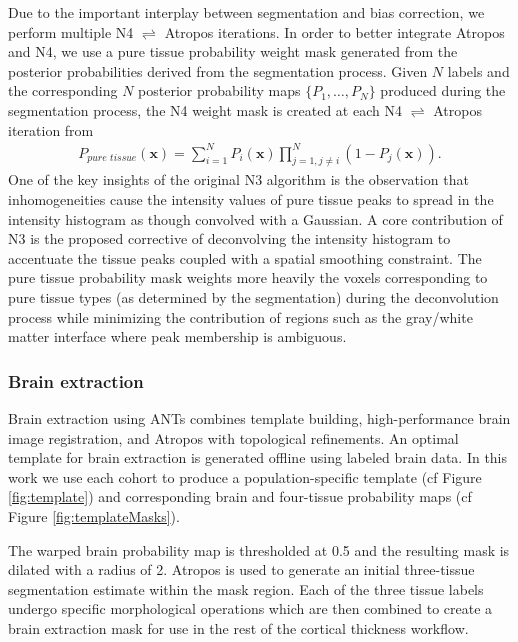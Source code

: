 Due to the important interplay between segmentation and bias correction,
we perform multiple N4 $\rightleftharpoons$ Atropos iterations.
In order to better integrate Atropos and N4, we use  
a pure tissue probability weight mask generated from the 
posterior probabilities derived from the segmentation 
process.  Given $N$ labels and the corresponding $N$
posterior probability maps $\{ P_1, \ldots, P_N\}$ produced
during the segmentation process, the N4 weight mask is 
created at each N4 $\rightleftharpoons$ Atropos iteration from
\begin{align}
  P_{pure\,\,tissue}(\mathbf{x}) = \sum_{i=1}^N P_i(\mathbf{x}) \prod_{j=1, j \neq i}^N \left( 1 - P_j(\mathbf{x}) \right).
\end{align}
One of the key insights of the original N3 algorithm is the
observation that inhomogeneities cause the intensity values of
pure tissue peaks to spread in the intensity histogram as though
convolved with a Gaussian.  A core contribution of N3 is the
proposed corrective of deconvolving the intensity histogram to 
accentuate the tissue peaks coupled with a spatial smoothing 
constraint. The pure tissue probability mask
weights more heavily the voxels corresponding to pure tissue 
types (as determined by the segmentation) during the deconvolution process 
while minimizing the contribution of regions such as the gray/white matter 
interface where peak membership is ambiguous. 

\subsubsection{Brain extraction}

Brain extraction using ANTs combines template building, high-performance
brain image registration, and Atropos with topological refinements.  
An optimal template for brain extraction is 
generated offline using labeled brain data.  
In this work we use each cohort to produce a population-specific template 
(cf Figure \ref{fig:template}) and corresponding brain and four-tissue probability
maps (cf Figure \ref{fig:templateMasks}). 

  The warped brain probability map is thresholded at 0.5 and the resulting mask is dilated
with a radius of 2.  Atropos is used to generate an initial three-tissue segmentation estimate within the mask
region.  Each of the three tissue labels undergo specific morphological operations which are then
combined to create a brain extraction mask for use in the rest of the
cortical thickness workflow.  

